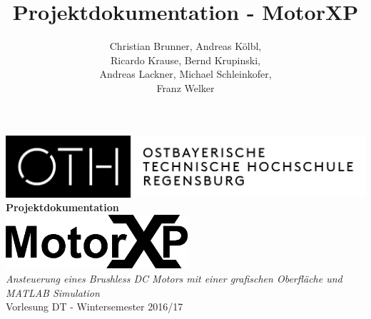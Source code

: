 \documentclass[a4paper,11pt]{report}
\begin{document}
\title{Projektdokumentation - MotorXP}

\author{Christian Brunner, Andreas Kölbl, \\
  Ricardo Krause, Bernd Krupinski, \\
  Andreas Lackner, Michael Schleinkofer, \\
  Franz Welker}


\lehead{\headmark}
\lohead{\headmark}


\renewcommand{\lstlistingname}{Code}
\lstset{
numbers=left,
stepnumber=1,
firstnumber=1,
numberfirstline=true,
breaklines=true}
\renewcommand{\figurename}{Bild}
\renewcommand{\refname}{Quellen}
\renewcommand{\bibname}{Quellen}
\renewcommand{\appendixname}{Anhang}
\renewcommand{\abstractname}{Zusammenfassung}
\renewcommand{\chaptername}{Kapitel}
\renewcommand\contentsname {Inhaltsverzeichnis}



\makeatletter
\begin{titlepage}
  \centering
  \vspace*{0.02\textheight}
  \includegraphics[width=\textwidth]{images/OTHLogo}\vspace*{0.1\textheight}
  {\huge\textbf{\\Projektdokumentation\\}}\vspace*{0.05\textheight}
  \includegraphics[height=2cm]{images/MotorXP}\vspace*{0.05\textheight}
  {\large\textit{\\Ansteuerung eines Brushless DC Motors mit einer grafischen Oberfläche und MATLAB Simulation}}\vspace*{0.03\textheight}
  {\\Vorlesung DT - Wintersemester 2016/17\\}\vspace*{0.2\textheight}
  {\@author}
\end{titlepage}
\makeatother
\tableofcontents
\end{document}
